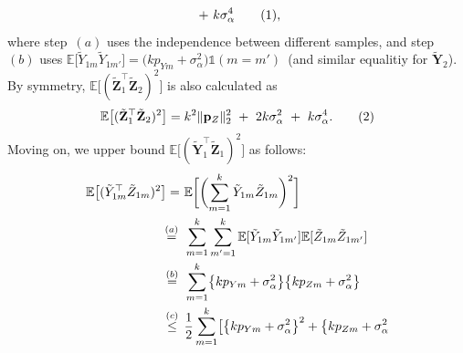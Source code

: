 \documentclass[twoside,11pt]{article}
\newcommand\numberthis{\addtocounter{equation}{1}\tag{\theequation}}
\newcommand{\rvTwo}{Y}
\newcommand{\rvThree}{Z}
\newcommand{\vectorize}[1]{\mathbf{#1}}
\newcommand{\mE}{\mathbb{E}} %
\newcommand{\alphabetSize}{k} %
\newcommand{\vectorIndex}{m}
\newcommand{\probVecElement}[2]{p_{{#1}{#2}}}
\newcommand{\probVec}{\mathbf{p}} %
\newcommand{\privacyParameter}{\alpha} %
\newcommand{\LapUParam}{\sigma_{\privacyParameter}}
\begin{document}
\begin{appendix}
\begin{align*}
		~+~
		\alphabetSize \LapUParam^4	
		\numberthis \label{eq:MYZTwoOne},	
	\end{align*}
	\noindent
	where step~$(a)$ uses the independence between different samples, and
	step~$(b)$ uses $
	\mE
	\bigl[
	\tilde{\rvTwo}_{1 \vectorIndex}
	\tilde{\rvTwo}_{1 \vectorIndex'}
	\bigr]
	=
	\bigl(
	\alphabetSize
	\probVecElement{\rvTwo}{\vectorIndex} + \LapUParam^2
	\bigr)
	\mathds{1}(\vectorIndex = \vectorIndex')$~(and similar equalitiy for $\tilde{\vectorize{\rvTwo}}_2$).
	By symmetry, $\mE
	\bigl[
	(
	\tilde{\vectorize{\rvThree}}_1^\top 
	\tilde{\vectorize{\rvThree}}_2
	)^2
	\bigr]$ is also calculated as
	\begin{align*}
		\mE
		\bigl[
		(
		\tilde{\vectorize{\rvThree}}_1^\top 
		\tilde{\vectorize{\rvThree}}_2
		)^2
		\bigr]
		=
		{\alphabetSize}^2 \|\probVec_{\rvThree}\|_2^2
		~+~
		2 {\alphabetSize} \LapUParam^2
		~+~
		\alphabetSize  \LapUParam^4.
		\numberthis \label{eq:MYZTwoTwo}
	\end{align*}
	Moving on, we upper bound $\mE \bigl[ ( \tilde{\vectorize{\rvTwo}}_1^\top \tilde{\vectorize{\rvThree}}_1 )^2 \bigr]$ as follows:
	\begin{align*}
		\mE
		\bigl[
		(
		\tilde{\rvTwo}_{1 \vectorIndex}^\top 
		\tilde{\rvThree}_{1 \vectorIndex}
		)^2
		\bigr]
		= ~&
		\mE
		\biggl[
		\biggl( 
		\sum_{\vectorIndex=1}^{\alphabetSize}
		\tilde{\rvTwo}_{1 \vectorIndex}
		\tilde{\rvThree}_{1 \vectorIndex}
		\biggr)^2
		\biggr]
		\\ \stackrel{(a)}{=} \hskip 1.57mm &
		\sum_{\vectorIndex=1}^{\alphabetSize}
		\sum_{\vectorIndex'=1}^{\alphabetSize}
		\mE
		[
		\tilde{\rvTwo}_{1 \vectorIndex}
		\tilde{\rvTwo}_{1 \vectorIndex'}
		]
		\mE
		[
		\tilde{\rvThree}_{1 \vectorIndex}
		\tilde{\rvThree}_{1 \vectorIndex'}
		]
		\\ \stackrel{(b)}{=} \hskip 1.57mm &
		\sum_{\vectorIndex=1}^{\alphabetSize}
		\bigl\{
		{\alphabetSize} \probVecElement{\rvTwo}{\vectorIndex} + \LapUParam^2
		\bigr\}
		\bigl\{
		{\alphabetSize} \probVecElement{\rvThree}{\vectorIndex} + \LapUParam^2
		\bigr\}
		\\ \stackrel{(c)}{\leq} \hskip 1.57mm &
		\frac{1}{2}
		\sum_{\vectorIndex=1}^{\alphabetSize}
		\bigl[
		\bigl\{
		{\alphabetSize} \probVecElement{\rvTwo}{\vectorIndex} + \LapUParam^2
		\bigr\}^2
		+
		\bigl\{
		{\alphabetSize} \probVecElement{\rvThree}{\vectorIndex} + \LapUParam^2

\end{align*}
\end{appendix}
\end{document}
